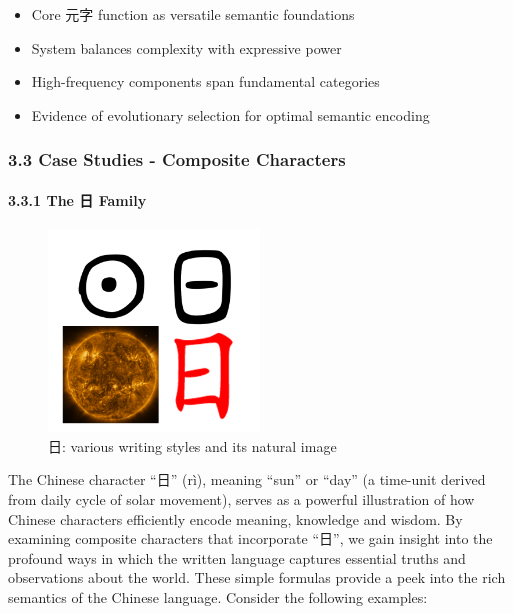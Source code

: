 \documentclass[
  11pt,
  letterpaper,
]{article}
\providecommand{\tightlist}{%
  \setlength{\itemsep}{0pt}\setlength{\parskip}{0pt}}
\begin{document}
\begin{itemize}
  \begin{itemize}
  \tightlist
  \item
    Core 元字 function as versatile semantic foundations
  \item
    System balances complexity with expressive power
  \item
    High-frequency components span fundamental categories
  \item
    Evidence of evolutionary selection for optimal semantic encoding
  \end{itemize}
\end{itemize}

\subsubsection{3.3 Case Studies - Composite
Characters}\label{case-studies---composite-characters}

\paragraph{3.3.1 The 日 Family}\label{the-ux65e5-family}

\begin{figure}
\centering
\includegraphics[width=0.5\textwidth]{./images/zi_sun.png}
\caption{日: various writing styles and its natural image}
\end{figure}

The Chinese character ``日'' (rì), meaning ``sun'' or ``day'' (a
time-unit derived from daily cycle of solar movement), serves as a
powerful illustration of how Chinese characters efficiently encode
meaning, knowledge and wisdom. By examining composite characters that
incorporate ``日'', we gain insight into the profound ways in which the
written language captures essential truths and observations about the
world. These simple formulas provide a peek into the rich semantics of
the Chinese language. Consider the following examples:
\end{document}

